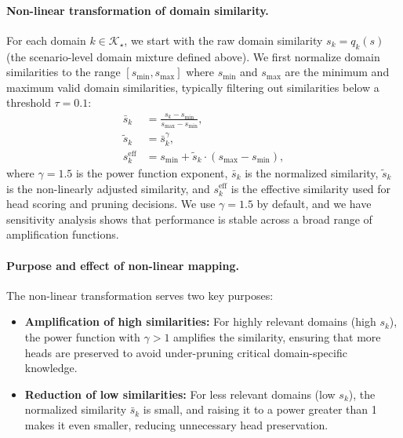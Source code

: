 \paragraph{Non-linear transformation of domain similarity.}
For each domain $k \in \mathcal{K}_\star$, we start with the raw domain similarity $s_k = q_k(s)$ (the scenario-level domain mixture defined above).
We first normalize domain similarities to the range $[s_{\min}, s_{\max}]$ where $s_{\min}$ and $s_{\max}$ are the minimum and maximum valid domain similarities, typically filtering out similarities below a threshold $\tau = 0.1$:
\begin{equation}
\label{eq:domain_keep_ratio_improved}
\begin{split}
\bar{s}_k &= \frac{s_k - s_{\min}}{s_{\max} - s_{\min}}, \\
\tilde{s}_k &= \bar{s}_k^\gamma, \\
s_k^{\text{eff}} &= s_{\min} + \tilde{s}_k \cdot (s_{\max} - s_{\min}),
\end{split}
\end{equation}
where $\gamma = 1.5$ is the power function exponent, $\bar{s}_k$ is the normalized similarity, $\tilde{s}_k$ is the non-linearly adjusted similarity, and $s_k^{\text{eff}}$ is the effective similarity used for head scoring and pruning decisions. We use \(\gamma=1.5\) by default, and we have sensitivity analysis shows that performance is stable across a broad range of amplification functions.

\paragraph{Purpose and effect of non-linear mapping.}
The non-linear transformation serves two key purposes:
\begin{itemize}
    \item \textbf{Amplification of high similarities:} For highly relevant domains (high $s_k$), the power function with $\gamma > 1$ amplifies the similarity, ensuring that more heads are preserved to avoid under-pruning critical domain-specific knowledge.
    \item \textbf{Reduction of low similarities:} For less relevant domains (low $s_k$), the normalized similarity $\bar{s}_k$ is small, and raising it to a power greater than 1 makes it even smaller, reducing unnecessary head preservation.
\end{itemize}

